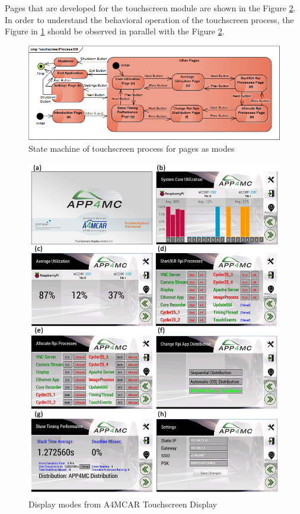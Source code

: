 Pages that are developed for the touchscreen module are shown in the Figure \ref{fig:displays}. In order to understand the behavioral operation of the touchscreen process, the Figure in \ref{fig:TouchscreenProcessSM} should be observed in parallel with the Figure \ref{fig:displays}. 
\begin{figure}[!ht]
	\centering
	\includegraphics[width=\textwidth]{content/images/TouchscreenProcessSM.png}
	\caption{State machine of touchscreen process for pages as modes}
	\label{fig:TouchscreenProcessSM}
\end{figure}
\begin{figure}[!ht]
	\centering
	\includegraphics[width=\textwidth]{content/images/displays.png}
	\caption{Display modes from A4MCAR Touchscreen Display}
	\label{fig:displays}
\end{figure}

